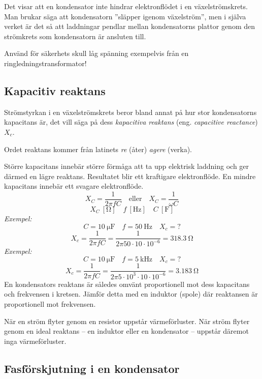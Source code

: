 Det visar att en kondensator inte hindrar elektronflödet i en växelströmskrets.
Man brukar säga att kondensatorn ''släpper igenom växelström'', men i själva 
verket är det så att laddningar pendlar mellan kondensatorns plattor genom den
strömkrets som kondensatorn är ansluten till.

Använd för säkerhets skull låg spänning exempelvis från en ringledningstransformator!

\subsection{Kapacitiv reaktans}
\label{kapacitiv_reaktans}

Strömstyrkan i en växelströmskrets beror bland annat på hur stor kondensatorns
kapacitans är, det vill säga på dess \emph{kapacitiva reaktans} (eng.
\emph{capacitive reactance}) \(X_c\).

Ordet reaktans kommer från latinets \emph{re} (åter) \emph{agere} (verka).

Större kapacitans innebär större förmåga att ta upp elektrisk laddning och ger
därmed en lägre reaktans. Resultatet blir ett kraftigare elektronflöde.
En mindre kapacitans innebär ett svagare elektronflöde.
\[X_C = \dfrac{1}{2\pi fC}\quad \text{eller}\quad X_C = \dfrac{1}{\omega C}\]
\[X_C\ [\unit{\ohm}]\quad f\ [\unit{\hertz}]\quad C\ [\unit{\farad}]\]
\emph{Exempel:}
\[C = \qty{10}{\micro\farad}\quad f = \qty{50}{\hertz}\quad X_c = ?\]
\[X_c = \dfrac{1}{2\pi fC} = \dfrac{1}{2\pi 50 \cdot 10 \cdot 10^{-6}} = \qty{318,3}{\ohm}\]
\emph{Exempel:}
\[C = \qty{10}{\micro\farad}\quad f = \qty{5}{\kilo\hertz}\quad X_c = ?\]
\[X_c = \dfrac{1}{2\pi fC} = \dfrac{1}{2\pi 5 \cdot 10^3 \cdot 10 \cdot 10^{-6}}
= \qty{3,183}{\ohm}\]
En kondensators reaktans är således omvänt proportionell mot dess kapacitans
och frekvensen i kretsen.
Jämför detta med en induktor (spole) där reaktansen är proportionell mot frekvensen.

När en ström flyter genom en resistor uppstår värmeförluster.
När ström flyter genom en ideal reaktans -- en induktor eller en kondensator --
uppstår däremot inga värmeförluster.

\subsection{Fasförskjutning i en kondensator}


